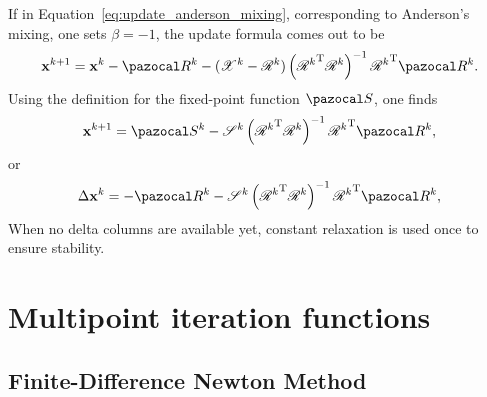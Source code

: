 If in Equation~\eqref{eq:update_anderson_mixing}, corresponding to Anderson's mixing, one sets \(\beta=-1\), the update formula comes out to be
\begin{equation}
  \mathbf x^{k+1} = \mathbf x^k - \pazocal R^k - (\mathscr X^k - \mathscr R^k)\left({\mathscr{R}^{k}}^{\mathrm{T}} \mathscr{R}^{k}\right)^{-1} {\mathscr{R}^{k}}^{\mathrm{T}} \pazocal R^{k}.
\end{equation}
Using the definition for the fixed-point function \(\pazocal S\), one finds
\begin{equation}
  \mathbf x^{k+1} = \pazocal S^k - \mathscr S^k\left({\mathscr{R}^{k}}^{\mathrm{T}} \mathscr{R}^{k}\right)^{-1} {\mathscr{R}^{k}}^{\mathrm{T}} \pazocal R^{k},
\end{equation}
or
\begin{equation}
  \Delta \mathbf x^{k} = - \pazocal R^k - \mathscr S^k\left({\mathscr{R}^{k}}^{\mathrm{T}} \mathscr{R}^{k}\right)^{-1} {\mathscr{R}^{k}}^{\mathrm{T}} \pazocal R^{k},
\end{equation}
When no delta columns are available yet, constant relaxation is used once to ensure stability.

\section{Multipoint iteration functions}

\subsection{Finite-Difference Newton Method}\label{sec:finite_difference_newton_method}


